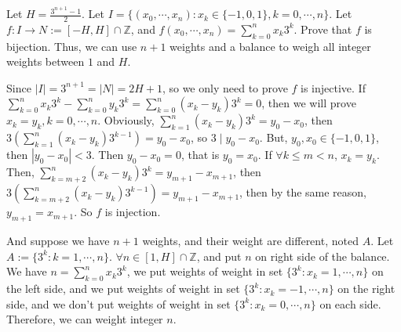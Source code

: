 \documentclass{ctexart}
\begin{document}
\begin{problem}\label{pro:p40.3}
  Let \(H=\frac{3^{n+1}-1}{2}\). Let \(I=\{(x_0,\cdots,x_n):x_k \in \{-1,0,1\},k=0,\cdots,n\}\).
  Let \(f:I \to N:=[-H,H]\cap \mathbb{Z}\), and \(f(x_0,\cdots,x_n)=\sum_{k=0}^{n}x_k 3^k\).
  Prove that \(f\) is bijection.
  Thus, we can use \(n+1\) weights and a balance to weigh all integer weights between \(1\) and \(H\).
\end{problem}
\begin{solution}
  Since \(|I|= 3^{n + 1}=|N|=2H + 1\), so we only need to prove \(f\) is injective.
  If \(\sum_{k=0}^{n}x_k3^k-\sum_{k=0}^{n}y_k3^k=\sum_{k=0}^{n}(x_k-y_k)3^k=0\), then we will prove \(x_k=y_k,k = 0,\cdots,n\).
  Obviously, \(\sum_{k=1}^{n}(x_k-y_k)3^k= y_0-x_0\), then \(3(\sum_{k=1}^{n}(x_k-y_k)3^{k-1}) = y_0 -x_0\), so
  \(3 \mid y_0-x_0\). But, \(y_0,x_0 \in \{-1,0,1\}\), then \(|y_0-x_0| <3\).
  Then \(y_0-x_0=0\), that is \(y_0=x_0\). If \(\forall k \leq m <n\), \(x_k=y_k\).
  Then, \(\sum_{k=m + 2}^{n}(x_k-y_k)3^k= y_{m + 1}-x_{m + 1}\), then \(3(\sum_{k=m +2}^{n}(x_k-y_k)3^{k-1}) = y_{m + 1} -x_{m + 1}\),
  then by the same reason, \(y_{m + 1}=x_{m + 1}\).
  So \(f\) is injection.

  And suppose we have \(n + 1\) weights, and their weight are different, noted \(A\).
  Let \(A:=\{3^k:k=1,\cdots,n\}\). \(\forall n \in [1,H]\cap \mathbb{Z}\), and put \(n\) on right side
  of the balance. We have \(n = \sum_{k=0}^{n} x_k 3^k\),
  we put weights of weight in set \(\{3^k:x_k=1,\cdots,n\}\) on the left side,
  and we put weights of weight in set \(\{3^k:x_k=-1,\cdots,n\}\) on the right side,
  and we don't put weights of weight in set \(\{3^k:x_k=0,\cdots,n\}\) on each side.
  Therefore, we can weight integer \(n\).
\end{solution}
\end{document}
